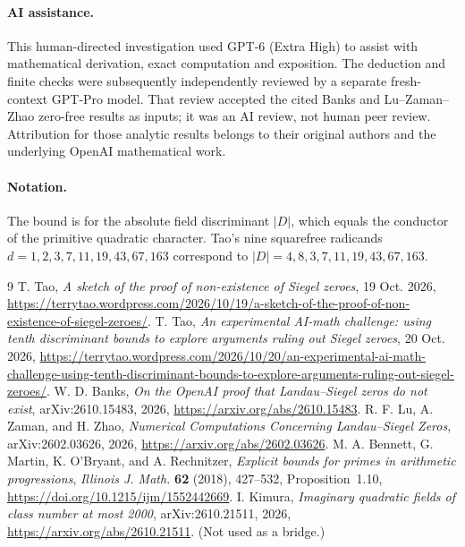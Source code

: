 \documentclass[10pt,a4paper]{article}
\begin{document}
\paragraph{AI assistance.}
This human-directed investigation used GPT-6 (Extra High) to assist with
mathematical derivation, exact computation and exposition. The deduction
and finite checks were subsequently independently reviewed by a separate
fresh-context GPT-Pro model. That review accepted the cited Banks and
Lu--Zaman--Zhao zero-free results as inputs; it was an AI review, not
human peer review. Attribution for those analytic results belongs to
their original authors and the underlying OpenAI mathematical work.

\paragraph{Notation.}
The bound is for the absolute field discriminant $|D|$, which equals the
conductor of the primitive quadratic character. Tao's nine squarefree
radicands $d=1,2,3,7,11,19,43,67,163$ correspond to
$|D|=4,8,3,7,11,19,43,67,163$.

\begin{thebibliography}{9}
\sloppy
{} T. Tao, \emph{A sketch of the proof of non-existence of Siegel zeroes}, 19 Oct. 2026,
\url{https://terrytao.wordpress.com/2026/10/19/a-sketch-of-the-proof-of-non-existence-of-siegel-zeroes/}.
 T. Tao, \emph{An experimental AI-math challenge: using tenth discriminant bounds to explore arguments ruling out Siegel zeroes}, 20 Oct. 2026,
\url{https://terrytao.wordpress.com/2026/10/20/an-experimental-ai-math-challenge-using-tenth-discriminant-bounds-to-explore-arguments-ruling-out-siegel-zeroes/}.
 W. D. Banks, \emph{On the OpenAI proof that Landau--Siegel zeros do not exist}, arXiv:2610.15483, 2026, \url{https://arxiv.org/abs/2610.15483}.
 R. F. Lu, A. Zaman, and H. Zhao, \emph{Numerical Computations Concerning Landau--Siegel Zeros}, arXiv:2602.03626, 2026, \url{https://arxiv.org/abs/2602.03626}.
 M. A. Bennett, G. Martin, K. O'Bryant, and A. Rechnitzer,
\emph{Explicit bounds for primes in arithmetic progressions},
\emph{Illinois J. Math.} \textbf{62} (2018), 427--532, Proposition~1.10,
\url{https://doi.org/10.1215/ijm/1552442669}.
 I. Kimura, \emph{Imaginary quadratic fields of class number at most 2000}, arXiv:2610.21511, 2026, \url{https://arxiv.org/abs/2610.21511}. (Not used as a bridge.)
\end{thebibliography}
\end{document}
